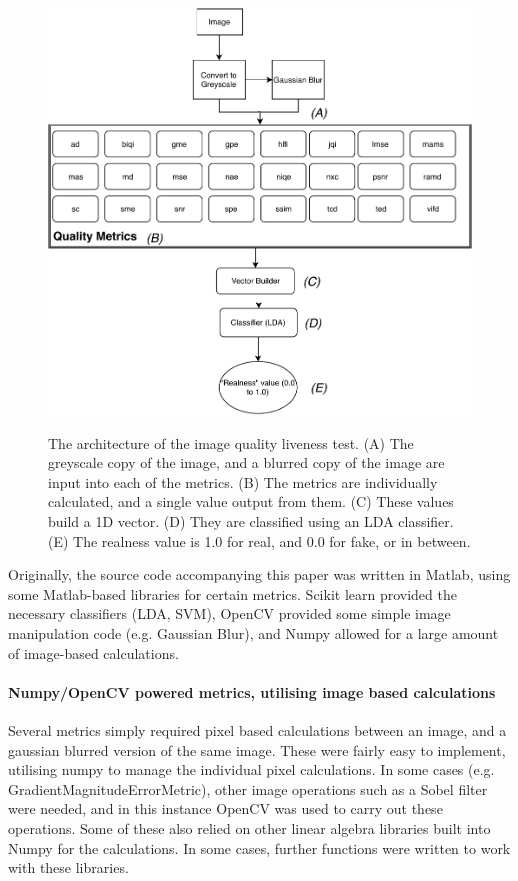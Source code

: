 \documentclass[10pt,a4paper]{article}
\begin{document}
        \begin{figure}
            \centering
            \includegraphics[width=\linewidth]{ImageQualityLivenessTest.pdf}
            \label{ImageQualityLivenessTestDiagram}
            \caption{The architecture of the image quality liveness test. (A) The greyscale copy of the image, and a blurred copy of the image are input into each of the metrics.
            (B) The metrics are individually calculated, and a single value output from them. (C) These values build a 1D vector. (D) They are classified using an LDA classifier. (E) The realness value
            is 1.0 for real, and 0.0 for fake, or in between.}
        \end{figure}

        Originally, the source code accompanying this paper was written in Matlab, using some Matlab-based libraries for certain metrics. Scikit learn provided 
        the necessary classifiers (LDA, SVM), OpenCV provided some simple image manipulation code (e.g. Gaussian Blur), and Numpy allowed for a large amount of
        image-based calculations.

        \paragraph{Numpy/OpenCV powered metrics, utilising image based calculations}
        Several metrics simply required pixel based calculations between an image, and a gaussian blurred version of the same image. These were fairly easy to implement,
        utilising numpy to manage the individual pixel calculations. In some cases (e.g. GradientMagnitudeErrorMetric), other image operations such as a Sobel filter were needed, and in this
        instance OpenCV was used to carry out these operations. Some of these also relied on other linear algebra libraries built into Numpy for the calculations.
        In some cases, further functions were written to work with these libraries.
\end{document}
